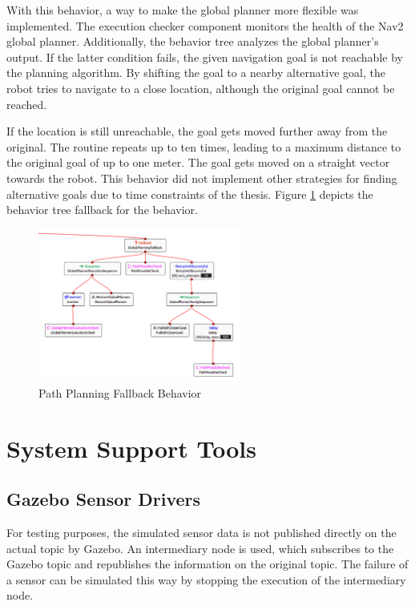 With this behavior, a way to make the global planner more flexible was implemented. The execution checker component monitors the health of the Nav2 global planner. Additionally, the behavior tree analyzes the global planner's output. If the latter condition fails, the given navigation goal is not reachable by the planning algorithm. By shifting the goal to a nearby alternative goal, the robot tries to navigate to a close location, although the original goal cannot be reached. 

If the location is still unreachable, the goal gets moved further away from the original. The routine repeats up to ten times, leading to a maximum distance to the original goal of up to one meter. The goal gets moved on a straight vector towards the robot. This behavior did not implement other strategies for finding alternative goals due to time constraints of the thesis. Figure \ref{fig:global_planning_fallback} depicts the behavior tree fallback for the behavior.

\begin{figure}[ht]
	\centering
	\includegraphics[width=0.6\textwidth]{images/global_planning_fallback_inverted.png}
	\caption{Path Planning Fallback Behavior}
	\label{fig:global_planning_fallback}
\end{figure}

\section{System Support Tools}
\subsection{Gazebo Sensor Drivers}
\label{subsec:gazebo_driver}

For testing purposes, the simulated sensor data is not published directly on the actual topic by Gazebo. An intermediary node is used, which subscribes to the Gazebo topic and republishes the information on the original topic. The failure of a sensor can be simulated this way by stopping the execution of the intermediary node. 
%

